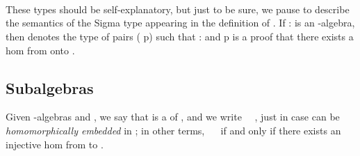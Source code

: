 \begin{code}
%
\\[\AgdaEmptyExtraSkip]%
\>[0]\AgdaSpace{}%
\AgdaSymbol{:}\AgdaSpace{}%
\AgdaSymbol{\{}\AgdaSpace{}%
\AgdaSymbol{:}\AgdaSpace{}%
\AgdaSpace{}%
\AgdaSpace{}%
\AgdaSymbol{\}}\AgdaSpace{}%
\AgdaSpace{}%
\AgdaSpace{}%
\AgdaSpace{}%
\<%
\\
\>[0]\AgdaSpace{}%
\AgdaSymbol{\{}\AgdaSpace{}%
\AgdaSymbol{=}\AgdaSpace{}%
\AgdaSymbol{\}\{}\AgdaSpace{}%
\AgdaSymbol{=}\AgdaSpace{}%
\AgdaSymbol{\}}\AgdaSpace{}%
\AgdaSymbol{=}\AgdaSpace{}%
\AgdaSpace{}%
\AgdaOperator{\AgdaInductiveConstructor{,}}\AgdaSpace{}%
\AgdaSpace{}%
\AgdaSymbol{\{}\AgdaSymbol{\}}\AgdaSpace{}%
\AgdaSpace{}%
\AgdaSpace{}%
\AgdaSpace{}%
\<%
\\
\>[0][@{}l@{\AgdaIndent{0}}]%
\>[1]\AgdaSpace{}%
\AgdaSpace{}%
\AgdaSpace{}%
\AgdaOperator{\AgdaFunction{𝔻[}}\AgdaSpace{}%
\AgdaSpace{}%
\AgdaOperator{\AgdaFunction{]}}\AgdaSpace{}%
\AgdaSpace{}%
\AgdaSymbol{(}\AgdaSpace{}%
\AgdaSpace{}%
\AgdaSymbol{)}\<%
\end{code}
\ifshort\else    %

\medskip

\noindent These types should be self-explanatory, but just to be sure, we pause
to describe the semantics of the Sigma type appearing in the definition of .
If  :    is an -algebra, then  
denotes the type of pairs ( \aic{,} \ab p) such that  :   
and \ab p is a proof that there exists a hom from  onto .
\fi      %

\subsection{Subalgebras}
\label{subalgebras}
Given -algebras  and , we say that  is a  of
, and we write ~~, just in case  can be \emph{homomorphically
embedded} in ; in other terms, ~~ if and only if there exists an injective
hom from  to .

